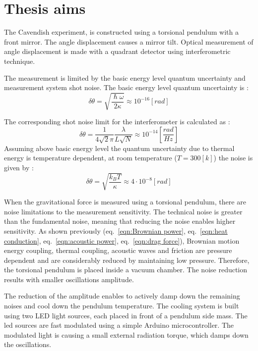 \documentclass[\main/master.tex]{subfiles}
\begin{document}
\chapter{Thesis aims}\label{chapter:Thesis aims}

The Cavendish experiment, is constructed using a torsional pendulum with a front mirror. The angle displacement causes a mirror tilt. Optical measurement of angle displacement is made with a quadrant detector using interferometric technique.
\par\noindent
The measurement is limited by the basic energy level quantum uncertainty and measurement system shot noise. The basic energy level quantum uncertainty is \cite{howell2019}:
\begin{equation}
\delta\theta= \sqrt{\frac{\hslash\omega}{2\kappa}} \approx 10^{-16} [rad]    \label{eqn:basic uncertainty}
\end{equation}
\par\noindent
The corresponding shot noise limit for the interferometer is calculated as \cite{howell2019}:
\begin{equation}
\delta\theta = \frac{1}{4\sqrt{2}\pi}\frac{\lambda}{L\sqrt{N}} \approx
10^{-14} [\frac{rad}{Hz}]    \label{eqn:shot limit}
\end{equation}
Assuming above basic energy level the quantum uncertainty due to thermal energy is temperature dependent, at room temperature ($T = 300[k]$) the noise is given by \cite{howell2019}:
\begin{equation}
\delta\theta = \sqrt{\frac{k_B T}{\kappa}} \approx 4\cdot 10^{-8} [rad] \label{eqn:Brownian uncertainty 3}
\end{equation}
\par\noindent
When the gravitational force is measured using a torsional pendulum, there are noise limitations to the measurement sensitivity. The technical noise is greater than the fundamental noise, meaning that reducing the noise enables higher sensitivity. As shown previously (eq.~\ref{eqn:Brownian power}, eq.~\ref{eqn:heat conduction}, eq.~\ref{eqn:acoustic power}, eq.~\ref{eqn:drag force}), Brownian motion energy coupling, thermal coupling, acoustic waves and friction are pressure dependent and are considerably reduced by maintaining low pressure. Therefore, the torsional pendulum is placed inside a vacuum chamber. The noise reduction results with smaller oscillations amplitude.
\par\noindent
The reduction of the amplitude enables to actively damp down the remaining noises and cool down the pendulum temperature. The cooling system is built using two LED light sources, each placed in front of a pendulum side mass. The led sources are fast modulated using a simple Arduino microcontroller. The modulated light is causing a small external radiation torque, which damps down the oscillations.
\end{document}
